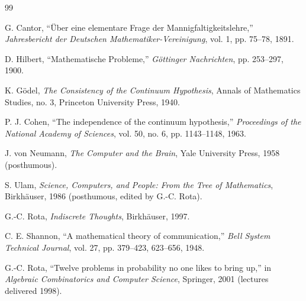 \documentclass{report}
\begin{document}
\begin{thebibliography}{99}

G. Cantor, ``\"Uber eine elementare Frage der Mannigfaltigkeitslehre,''
\emph{Jahresbericht der Deutschen Mathematiker-Vereinigung}, vol. 1, pp. 75--78, 1891.

D. Hilbert, ``Mathematische Probleme,'' \emph{G\"ottinger Nachrichten}, pp. 253--297, 1900.

K. G\"odel, \emph{The Consistency of the Continuum Hypothesis},
Annals of Mathematics Studies, no. 3, Princeton University Press, 1940.

P. J. Cohen, ``The independence of the continuum hypothesis,''
\emph{Proceedings of the National Academy of Sciences}, vol. 50, no. 6,
pp. 1143--1148, 1963.

J. von Neumann, \emph{The Computer and the Brain}, Yale University Press, 1958 (posthumous).

S. Ulam, \emph{Science, Computers, and People: From the Tree of Mathematics},
Birkh\"auser, 1986 (posthumous, edited by G.-C. Rota).

G.-C. Rota, \emph{Indiscrete Thoughts}, Birkh\"auser, 1997.

C. E. Shannon, ``A mathematical theory of communication,''
\emph{Bell System Technical Journal}, vol. 27, pp. 379--423, 623--656, 1948.

G.-C. Rota, ``Twelve problems in probability no one likes to bring up,''
in \emph{Algebraic Combinatorics and Computer Science}, Springer, 2001
(lectures delivered 1998).

\end{thebibliography}
\end{document}
